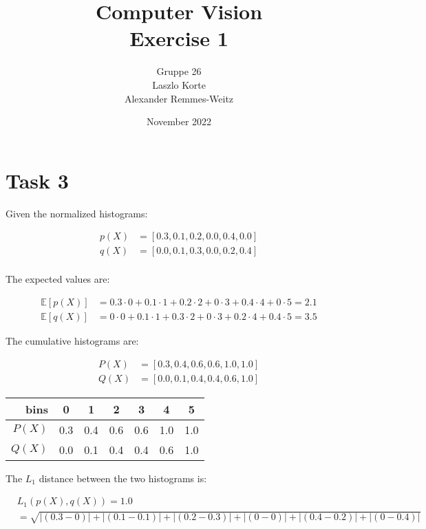 \documentclass{article}
\title{Computer Vision\\Exercise 1}
\author{Gruppe 26\\Laszlo Korte\\Alexander Remmes-Weitz
}
\date{November 2022}
\begin{document}
\maketitle

\section*{Task 3}
\centering
Given the normalized histograms:

\begin{align*}
p(X) &= [0.3, 0.1, 0.2, 0.0, 0.4, 0.0]\\
q(X) &= [0.0, 0.1, 0.3, 0.0, 0.2, 0.4]\\
\end{align*}

The expected values are:

\begin{align*}
\mathbb{E}[p(X)] &= 0.3 \cdot 0 + 0.1 \cdot 1 + 0.2 \cdot 2 + 0 \cdot 3 + 0.4 \cdot 4 + 0 \cdot 5 = 2.1\\
\mathbb{E}[q(X)] &= 0 \cdot 0 + 0.1 \cdot 1 + 0.3 \cdot 2 + 0 \cdot 3 + 0.2 \cdot 4 + 0.4 \cdot 5 = 3.5
\end{align*}

The cumulative histograms are:

\begin{align*}
P(X) &= [0.3, 0.4, 0.6, 0.6, 1.0, 1.0]\\
Q(X) &= [0.0, 0.1, 0.4, 0.4, 0.6, 1.0]
\end{align*}

\begin{table}[H]

    \centering\begin{tabular}{r|c|c|c|c|c|c}
   bins & 0 & 1 & 2 & 3 & 4 & 5\\
    \hline
    $P(X)$ & 0.3 & 0.4 & 0.6 & 0.6 & 1.0 & 1.0\\
    $Q(X)$ & 0.0 & 0.1 & 0.4 & 0.4 & 0.6 & 1.0
\end{tabular}
\end{table}

The $L_1$ distance between the two histograms is:

\begin{align*}
& L_1(p(X),q(X)) = 1.0\\ &= \sqrt{|(0.3-0)| + |(0.1-0.1)| + |(0.2-0.3)| + |(0-0)| + |(0.4-0.2)| + |(0-0.4)|}
\end{align*}
\end{document}
